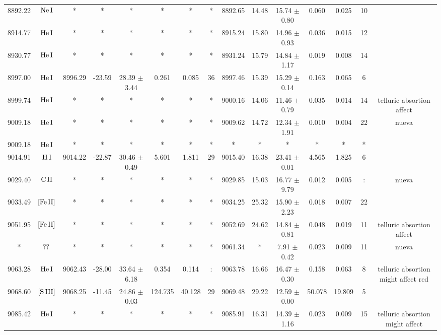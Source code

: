 \documentclass{article}
\begin{document}
\begin{table*}
\begin{adjustbox}{width=\textwidth}
\begin{tabular}{ccccccccccccccc}
8892.22 & $\mbox{Ne}\thinspace \mbox{I}$ & * & * & * & * & * & * & 8892.65 & 14.48 & 15.74 $\pm$ 0.80 & 0.060 & 0.025 & 10 &  \\
8914.77 & $\mbox{He}\thinspace \mbox{I}$ & * & * & * & * & * & * & 8915.24 & 15.80 & 14.96 $\pm$ 0.93 & 0.036 & 0.015 & 12 &  \\
8930.77 & $\mbox{He}\thinspace \mbox{I}$ & * & * & * & * & * & * & 8931.24 & 15.79 & 14.84 $\pm$ 1.17 & 0.019 & 0.008 & 14 &  \\
8997.00 & $\mbox{He}\thinspace \mbox{I}$ & 8996.29 & -23.59 & 28.39 $\pm$ 3.44 & 0.261 & 0.085 & 36 & 8997.46 & 15.39 & 15.29 $\pm$ 0.14 & 0.163 & 0.065 & 6 &  \\
8999.74 & $\mbox{He}\thinspace \mbox{I}$ & * & * & * & * & * & * & 9000.16 & 14.06 & 11.46 $\pm$ 0.79 & 0.035 & 0.014 & 14 &  telluric absortion affect \\
9009.18 & $\mbox{He}\thinspace \mbox{I}$ & * & * & * & * & * & * & 9009.62 & 14.72 & 12.34 $\pm$ 1.91 & 0.010 & 0.004 & 22 &  nueva \\
9009.18 & $\mbox{He}\thinspace \mbox{I}$ & * & * & * & * & * & * & * & * & * & * & * & * &  \\
9014.91 & $\mbox{H}\thinspace \mbox{I}$ & 9014.22 & -22.87 & 30.46 $\pm$ 0.49 & 5.601 & 1.811 & 29 & 9015.40 & 16.38 & 23.41 $\pm$ 0.01 & 4.565 & 1.825 & 6 &  \\
9029.40 & $\mbox{C}\thinspace \mbox{II}$ & * & * & * & * & * & * & 9029.85 & 15.03 & 16.77 $\pm$ 9.79 & 0.012 & 0.005 & : &  nueva \\
9033.49 & $\mbox{[Fe}\thinspace \mbox{II]}$ & * & * & * & * & * & * & 9034.25 & 25.32 & 15.90 $\pm$ 2.23 & 0.018 & 0.007 & 22 &  \\
9051.95 & $\mbox{[Fe}\thinspace \mbox{II]}$ & * & * & * & * & * & * & 9052.69 & 24.62 & 14.84 $\pm$ 0.81 & 0.048 & 0.019 & 11 &  telluric absortion affect \\
* & $\mbox{??}\thinspace \mbox{}$ & * & * & * & * & * & * & 9061.34 & * & 7.91 $\pm$ 0.42 & 0.023 & 0.009 & 11 &  nueva \\
9063.28 & $\mbox{He}\thinspace \mbox{I}$ & 9062.43 & -28.00 & 33.64 $\pm$ 6.18 & 0.354 & 0.114 & : & 9063.78 & 16.66 & 16.47 $\pm$ 0.30 & 0.158 & 0.063 & 8 &  telluric absortion might affect red \\
9068.60 & $\mbox{[S}\thinspace \mbox{III]}$ & 9068.25 & -11.45 & 24.86 $\pm$ 0.03 & 124.735 & 40.128 & 29 & 9069.48 & 29.22 & 12.59 $\pm$ 0.00 & 50.078 & 19.809 & 5 &  \\
9085.42 & $\mbox{He}\thinspace \mbox{I}$ & * & * & * & * & * & * & 9085.91 & 16.31 & 14.39 $\pm$ 1.16 & 0.023 & 0.009 & 15 &  telluric absortion might affect \\

\end{tabular}
\end{adjustbox}
\end{table*}
\end{document}

